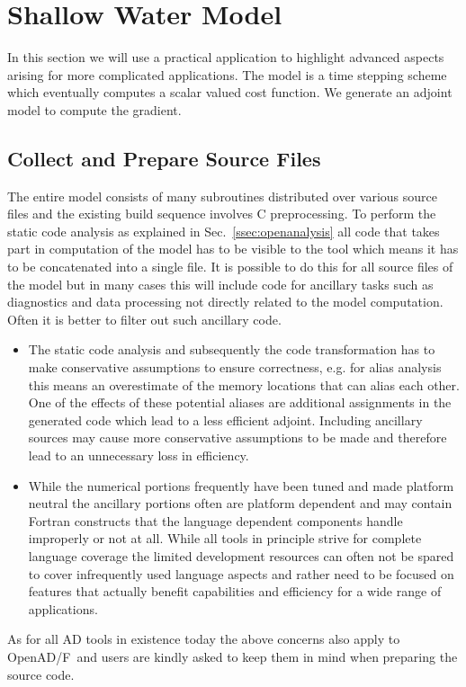 \documentclass{book}
\newcommand{\OpenADF}{OpenAD/F}
\newcommand{\refsec}[1]{{Sec.~\ref{#1}}}
\begin{document}
\section{Shallow Water Model}
In this section we will use a practical application to highlight 
advanced aspects arising for more complicated applications. 
The model is a time stepping scheme which eventually computes 
a scalar valued cost function. We generate an adjoint model 
to compute the gradient.  

\subsection{Collect and Prepare Source Files} 
The entire model consists of many subroutines distributed over various 
source files and the existing build sequence involves C preprocessing.
To perform the static code analysis as explained in \refsec{ssec:openanalysis}
all code that takes part in computation of the model has to be visible 
to the tool which means it has to be concatenated into a single file. 
It is possible to do this for all source files of the model but in many 
cases this will include code for ancillary tasks such as diagnostics 
and data processing not directly related to the model computation.
Often it is better to filter out such ancillary code. 
\begin{itemize}
\item The static code analysis and subsequently the code transformation
has to make conservative assumptions to ensure 
correctness, e.g. for alias analysis this means an overestimate of 
the memory locations that can alias each other. One of the effects of these potential aliases
are additional assignments in the generated code  which lead to 
a less efficient adjoint. Including ancillary sources may cause more conservative 
assumptions to be made and therefore lead to an unnecessary loss in efficiency.
\item While the numerical portions frequently have been tuned and made platform 
neutral the ancillary portions often are platform dependent and may contain
Fortran constructs that the language dependent components handle improperly or 
not at all. While all tools in principle strive for complete language coverage 
the limited development resources can often not be spared to cover 
infrequently used language aspects and rather need to be focused on features 
that actually benefit capabilities and efficiency for a wide range of applications.
\end{itemize}
As for all AD tools in existence today the above concerns also apply to 
\OpenADF\ and  users are kindly asked to keep them in mind when
preparing the source code.
\end{document}
